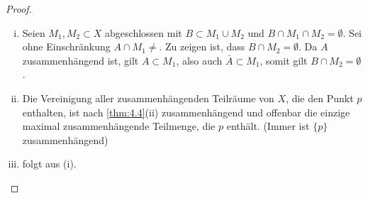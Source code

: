\documentclass[a4paper,10pt]{scrartcl}
\begin{document}
\begin{proof}
 \begin{enumerate}[(i)]
  \item Seien $M_1,M_2\subset X$ abgeschlossen mit $B\subset M_1\cup M_2$ und $B\cap M_1\cap M_2=\emptyset$. 
Sei ohne Einschränkung $A\cap M_1\neq$. Zu zeigen ist, dass $B\cap M_2=\emptyset$. Da $A$ zusammenhängend ist, gilt $A\subset M_1$, also auch $\bar A \subset M_1$, somit gilt $B\cap M_2=\emptyset$.
\item Die Vereinigung aller zusammenhängenden Teilräume von $X$, die den Punkt $p$ enthalten, ist nach \ref{thm:4.4}(ii)
 zusammenhängend und offenbar die einzige maximal zusammenhängende Teilmenge, die $p$ enthält. (Immer ist $\{p\}$ zusammenhängend)
\item folgt aus (i).
 \end{enumerate}
\end{proof}
\end{document}

